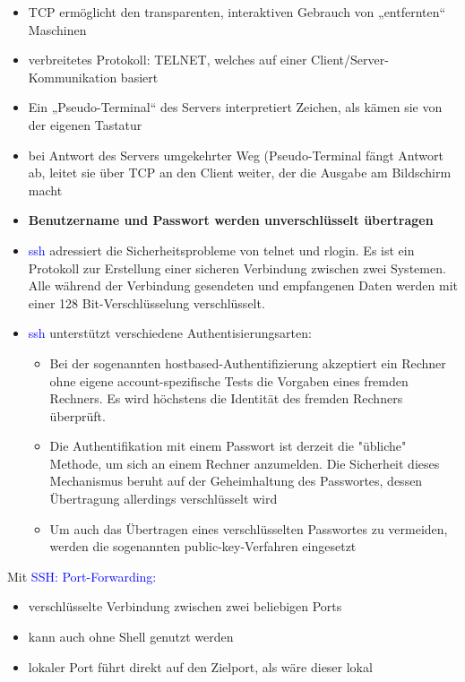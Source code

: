 \begin{itemize}
    \item TCP ermöglicht den transparenten, interaktiven Gebrauch von „entfernten“ Maschinen
    \item verbreitetes Protokoll: TELNET, welches auf einer Client/Server-Kommunikation basiert
    \item Ein „Pseudo-Terminal“ des Servers interpretiert Zeichen, als kämen sie von der eigenen Tastatur
    \item bei Antwort des Servers umgekehrter Weg (Pseudo-Terminal fängt Antwort ab, leitet sie über TCP an den Client weiter, der die Ausgabe am Bildschirm macht
    \item \textbf{Benutzername und Passwort werden unverschlüsselt übertragen}
\end{itemize}

\begin{itemize}
    \item \textcolor{blue}{ssh} adressiert die Sicherheitsprobleme von telnet und rlogin.
    Es ist ein Protokoll zur Erstellung einer sicheren Verbindung zwischen zwei Systemen.
    Alle während der Verbindung gesendeten und empfangenen Daten werden mit einer 128 Bit-Verschlüsselung verschlüsselt.
    \item \textcolor{blue}{ssh} unterstützt verschiedene Authentisierungsarten:
    \begin{itemize}
        \item Bei der sogenannten hostbased-Authentifizierung akzeptiert ein Rechner ohne eigene account-spezifische Tests die Vorgaben eines fremden Rechners.
        Es wird höchstens die Identität des fremden Rechners überprüft.
        \item Die Authentifikation mit einem Passwort ist derzeit die "übliche" Methode, um sich an einem Rechner anzumelden.
        Die Sicherheit dieses Mechanismus beruht auf der Geheimhaltung des Passwortes, dessen Übertragung allerdings verschlüsselt wird
        \item Um auch das Übertragen eines verschlüsselten Passwortes zu vermeiden, werden die sogenannten public-key-Verfahren eingesetzt
    \end{itemize}
\end{itemize}

Mit \textcolor{blue}{SSH: Port-Forwarding:}
\begin{itemize}
    \item verschlüsselte Verbindung zwischen zwei beliebigen Ports
    \item kann auch ohne Shell genutzt werden
    \item lokaler Port führt direkt auf den Zielport, als wäre dieser lokal
\end{itemize}


